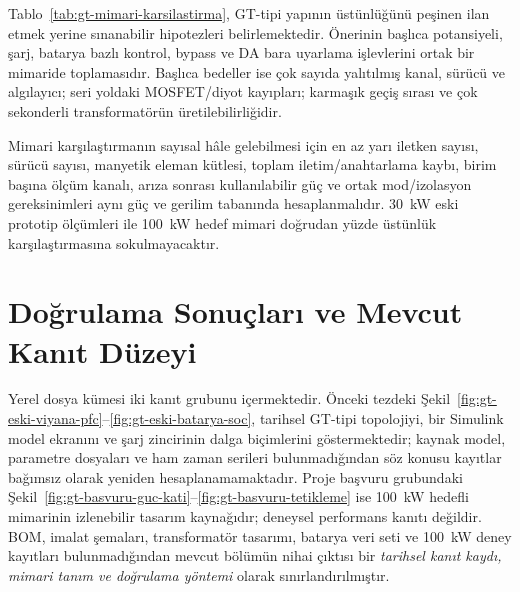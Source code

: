 Tablo~\ref{tab:gt-mimari-karsilastirma}, GT-tipi yapının üstünlüğünü peşinen ilan etmek yerine sınanabilir hipotezleri belirlemektedir. Önerinin başlıca potansiyeli, şarj, batarya bazlı kontrol, bypass ve DA bara uyarlama işlevlerini ortak bir mimaride toplamasıdır. Başlıca bedeller ise çok sayıda yalıtılmış kanal, sürücü ve algılayıcı; seri yoldaki MOSFET/diyot kayıpları; karmaşık geçiş sırası ve çok sekonderli transformatörün üretilebilirliğidir.

Mimari karşılaştırmanın sayısal hâle gelebilmesi için en az yarı iletken sayısı, sürücü sayısı, manyetik eleman kütlesi, toplam iletim/anahtarlama kaybı, birim başına ölçüm kanalı, arıza sonrası kullanılabilir güç ve ortak mod/izolasyon gereksinimleri aynı güç ve gerilim tabanında hesaplanmalıdır. \SI{30}{\kilo\watt} eski prototip ölçümleri ile \SI{100}{\kilo\watt} hedef mimari doğrudan yüzde üstünlük karşılaştırmasına sokulmayacaktır.

\section{Doğrulama Sonuçları ve Mevcut Kanıt Düzeyi}
\label{sec:gt-dogrulama}

Yerel dosya kümesi iki kanıt grubunu içermektedir. Önceki tezdeki Şekil~\ref{fig:gt-eski-viyana-pfc}--\ref{fig:gt-eski-batarya-soc}, tarihsel GT-tipi topolojiyi, bir Simulink model ekranını ve şarj zincirinin dalga biçimlerini göstermektedir; kaynak model, parametre dosyaları ve ham zaman serileri bulunmadığından söz konusu kayıtlar bağımsız olarak yeniden hesaplanamamaktadır. Proje başvuru grubundaki Şekil~\ref{fig:gt-basvuru-guc-kati}--\ref{fig:gt-basvuru-tetikleme} ise \SI{100}{\kilo\watt} hedefli mimarinin izlenebilir tasarım kaynağıdır; deneysel performans kanıtı değildir. BOM, imalat şemaları, transformatör tasarımı, batarya veri seti ve \SI{100}{\kilo\watt} deney kayıtları bulunmadığından mevcut bölümün nihai çıktısı bir \emph{tarihsel kanıt kaydı, mimari tanım ve doğrulama yöntemi} olarak sınırlandırılmıştır.

